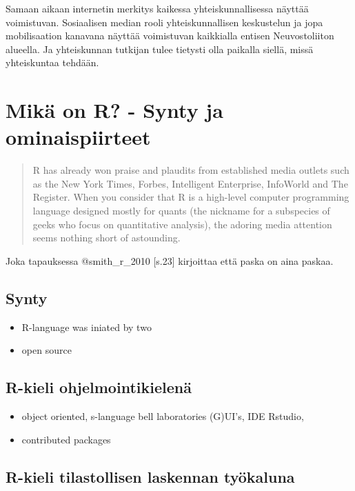 Samaan aikaan internetin merkitys kaikessa yhteiskunnallisessa näyttää
voimistuvan. Sosiaalisen median rooli yhteiskunnallisen keskustelun ja
jopa mobilisaation kanavana näyttää voimistuvan kaikkialla entisen
Neuvostoliiton alueella. Ja yhteiskunnan tutkijan tulee tietysti olla
paikalla siellä, missä yhteiskuntaa tehdään.

\section{Mikä on R? - Synty ja
ominaispiirteet}\label{mikuxe4-on-r---synty-ja-ominaispiirteet}

\begin{quote}
R has already won praise and plaudits from established media outlets
such as the New York Times, Forbes, Intelligent Enterprise, InfoWorld
and The Register. When you consider that R is a high-level computer
programming language designed mostly for quants (the nickname for a
subspecies of geeks who focus on quantitative analysis), the adoring
media attention seems nothing short of astounding.
\end{quote}

Joka tapauksessa @smith\_r\_2010 {[}s.23{]} kirjoittaa että paska on
aina paskaa.

\subsection{Synty}\label{synty}

\begin{itemize}
\itemsep1pt\parskip0pt
\item
  R-language was iniated by two
\item
  open source
\end{itemize}

\subsection{R-kieli
ohjelmointikielenä}\label{r-kieli-ohjelmointikielenuxe4}

\begin{itemize}
\itemsep1pt\parskip0pt
\item
  object oriented, s-language bell laboratories (G)UI's, IDE Rstudio,
\item
  contributed packages
\end{itemize}

\subsection{R-kieli tilastollisen laskennan
työkaluna}\label{r-kieli-tilastollisen-laskennan-tyuxf6kaluna}

